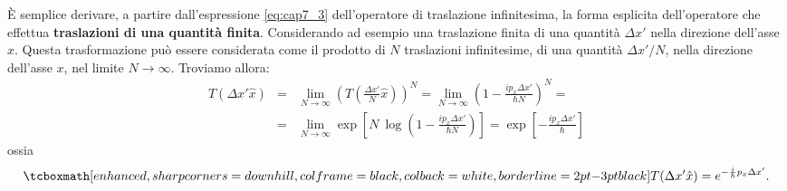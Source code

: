 È semplice derivare, a partire dall'espressione \eqref{eq:cap7_3} dell'operatore di traslazione infinitesima, la forma esplicita dell'operatore che effettua \textbf{traslazioni di una quantità finita}. Considerando ad esempio una traslazione finita di una quantità $\Delta x '$ nella direzione dell'asse $x$. Questa trasformazione può essere considerata come il prodotto di $N$ traslazioni infinitesime, di una quantità $\Delta x ' / N$, nella direzione dell'asse $x$, nel limite $N\rightarrow \infty $. Troviamo allora:
	\begin{eqnarray}
	T(\Delta x'\hat{x}) & = & \lim _{N\rightarrow \infty} \left(T \left( \frac{\Delta x'}{N}\hat{x} \right) \right) ^N = \lim _{N\rightarrow \infty} \left( 1- \frac{i p_x \Delta x'}{\hbar N} \right) ^N =\nonumber \\
	&=& \lim _{N\rightarrow \infty} \exp \left[N\ \log \left(1- \frac{i p_x \Delta x'}{\hbar N}  \right) \right] =   \exp \left[  -\frac{i p_x \Delta x'}{\hbar}  \right] 
	\end{eqnarray}
ossia
	\begin{equation}
		\tcboxmath[enhanced, sharp corners=downhill, colframe=black, colback=white, borderline={2pt}{-3pt}{black}]{	
			T(\Delta x'\hat{x}) = e^{-\frac{i}{\hbar} p_x \Delta x' }.
			}
	\end{equation}
